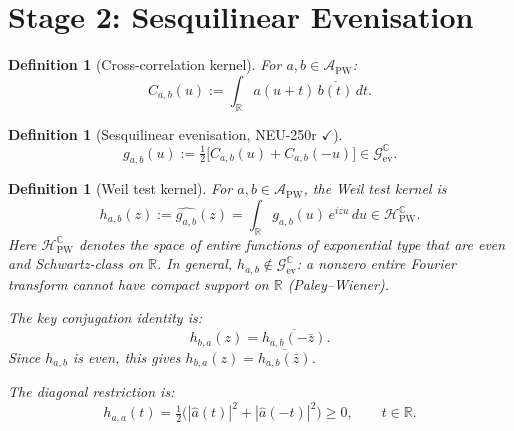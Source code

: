 \documentclass[11pt,a4paper]{amsart}
\newtheorem{definition}[theorem]{Definition}
\begin{document}
\section{Stage 2: Sesquilinear Evenisation}

\begin{definition}[Cross-correlation kernel]
For $a,b\in\mathcal{A}_{\mathrm{PW}}$:
\[
  C_{a,b}(u) := \int_{\mathbb{R}} a(u+t)\,\overline{b(t)}\,dt.
\]
\end{definition}

\begin{definition}[Sesquilinear evenisation, NEU-250r $\checkmark$]
\[
  \boxed{g_{a,b}(u) := \tfrac{1}{2}\bigl[C_{a,b}(u) + C_{a,b}(-u)\bigr]
  \in \mathcal{G}_{\mathrm{ev}}^{\mathbb{C}}.}
\]
\end{definition}

\begin{definition}[Weil test kernel]\label{def:hab}
For $a,b\in\mathcal{A}_{\mathrm{PW}}$, the Weil test kernel is
\[
  \boxed{h_{a,b}(z) := \widehat{g_{a,b}}(z)
         = \int_{\mathbb{R}} g_{a,b}(u)\,e^{izu}\,du
         \in \mathcal{H}_{\mathrm{PW}}^{\mathbb{C}}.}
\]
Here $\mathcal{H}_{\mathrm{PW}}^{\mathbb{C}}$ denotes the space of entire
functions of exponential type that are even and Schwartz-class on $\mathbb{R}$.
In general, $h_{a,b}\notin\mathcal{G}_{\mathrm{ev}}^{\mathbb{C}}$: a nonzero entire
Fourier transform cannot have compact support on $\mathbb{R}$ (Paley--Wiener).

The key conjugation identity is:
\[
  \boxed{h_{b,a}(z) = \overline{h_{a,b}(-\bar{z})}.}
\]
Since $h_{a,b}$ is even, this gives $h_{b,a}(z)=\overline{h_{a,b}(\bar{z})}$.

The diagonal restriction is:
\[
  h_{a,a}(t) = \tfrac{1}{2}\bigl(|\hat{a}(t)|^2 + |\hat{a}(-t)|^2\bigr)
  \ge 0,\qquad t\in\mathbb{R}.
\]
\end{definition}
\end{document}

